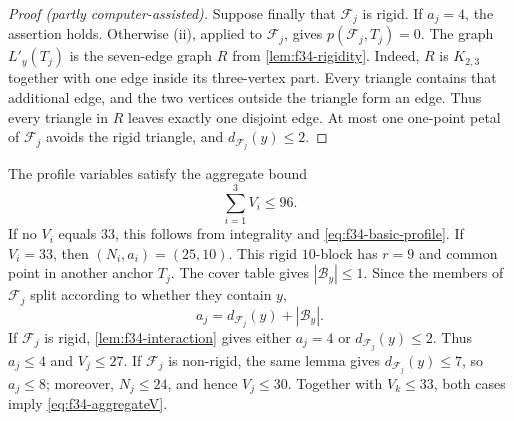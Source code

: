 \documentclass[11pt]{article}
\numberwithin{equation}{section}
\theoremstyle{definition}
\theoremstyle{remark}
\newcommand{\F}{\mathcal F}
\newcommand{\B}{\mathcal B}
\begin{document}
\begin{proof}[Proof (partly computer-assisted)]
Suppose finally that $\F_j$ is rigid. If $a_j=4$, the assertion holds.
Otherwise (ii), applied to $\F_j$, gives $p(\F_j,T_j)=0$.
The graph $L'_y(T_j)$ is the seven-edge graph $R$ from
\cref{lem:f34-rigidity}. Indeed, $R$ is $K_{2,3}$ together with one edge
inside its three-vertex part. Every triangle contains that additional edge,
and the two vertices outside the triangle form an edge. Thus every triangle
in $R$ leaves exactly one disjoint edge. At most one one-point petal of
$\F_j$ avoids the rigid triangle, and $d_{\F_j}(y)\le2$.
\end{proof}

The profile variables satisfy the aggregate bound
\begin{equation}
 \sum_{i=1}^3V_i\le96.
 \label{eq:f34-aggregateV}
\end{equation}
If no $V_i$ equals $33$, this follows from integrality and
\cref{eq:f34-basic-profile}. If $V_i=33$, then
$(N_i,a_i)=(25,10)$. This rigid $10$-block has $r=9$ and common point in
another anchor $T_j$. The cover table gives $|\B_y|\le1$. Since the
members of $\F_j$ split according to whether they contain $y$,
\[
 a_j=d_{\F_j}(y)+|\B_y|.
\]
If $\F_j$ is rigid, \cref{lem:f34-interaction} gives either $a_j=4$ or
$d_{\F_j}(y)\le2$. Thus $a_j\le4$ and $V_j\le27$. If $\F_j$ is
non-rigid, the same lemma gives $d_{\F_j}(y)\le7$, so $a_j\le8$; moreover,
$N_j\le24$, and hence $V_j\le30$. Together with $V_k\le33$, both cases
imply \cref{eq:f34-aggregateV}.
\end{document}
